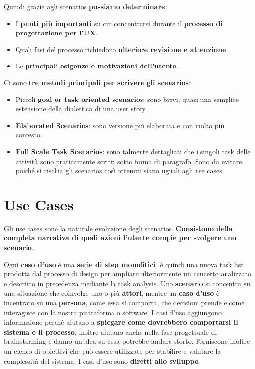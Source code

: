 \documentclass[a4paper,11pt,oneside]{book}
\begin{document}
Quindi grazie agli scenarios \textbf{possiamo determinare}:

\begin{itemize}
	\item I \textbf{punti più importanti} su cui concentrarsi durante il \textbf{processo di progettazione per l'UX}.
	\item Quali fasi del processo richiedono \textbf{ulteriore revisione e attenzione}.
	\item Le \textbf{principali esigenze e motivazioni dell'utente}.
\end{itemize}

\pagebreak

Ci sono \textbf{tre metodi principali per scrivere gli scenarios}:

\begin{itemize}
	\item Piccoli \textbf{goal or task oriented scenarios}: sono brevi, quasi una semplice estensione della dialettica di una user story.
	\item \textbf{Elaborated Scenarios}: sono versione più elaborata e con molto più contesto.
	\item \textbf{Full Scale Task Scenarios}: sono talmente dettagliati che i singoli task delle attività sono praticamente scritti sotto forma di paragrafo. Sono da evitare poiché si rischia gli scenarios così ottenuti siano uguali agli use cases.
\end{itemize}

\section{Use Cases}

Gli use cases sono la naturale evoluzione degli scenarios.
\textbf{Consistono della completa narrativa di quali azioni l'utente compie per svolgere uno scenario}.

Ogni \textbf{caso d'uso} è una \textbf{serie di step monolitici}, è quindi una nuova task list prodotta dal processo di design per ampliare ulteriormente un concetto analizzato e descritto in precedenza mediante la task analysis.
Uno \textbf{scenario} si concentra su una situazione che coinvolge uno o più \textbf{attori}, mentre un
\textbf{caso d'uso} è incentrato su una \textbf{persona}, come essa si comporta, che decisioni prende e come interagisce con la nostra piattaforma o software. I casi d'uso aggiungono informazione perché aiutano a \textbf{spiegare come dovrebbero comportarsi
	il sistema e il processo}, inoltre aiutano anche nella fase progettuale di brainstorming e danno un'idea su cosa potrebbe andare storto. Forniscono inoltre un elenco di obiettivi che può essere utilizzato per stabilire e valutare la complessità del sistema. I casi d'uso sono \textbf{diretti allo sviluppo}.
\end{document}
